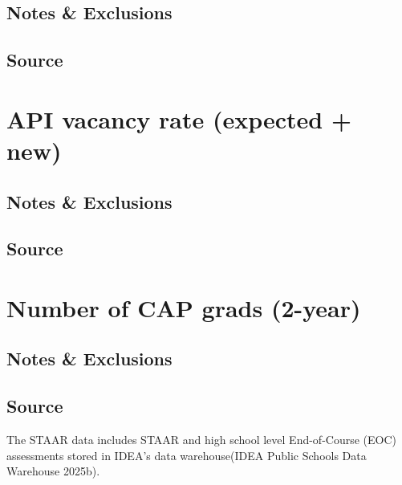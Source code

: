 \documentclass[
  letterpaper,
  DIV=11,
  numbers=noendperiod]{scrreprt}
\begin{document}
\subsection{Notes \& Exclusions}\label{notes-exclusions-3}

\subsection{Source}\label{source-6}

\section{API vacancy rate (expected + new)}\label{sec-05APIVacancy}

\subsection{Notes \& Exclusions}\label{notes-exclusions-4}

\subsection{Source}\label{source-7}

\section{Number of CAP grads (2-year)}\label{sec-05CAPGrads}

\subsection{Notes \& Exclusions}\label{notes-exclusions-5}

\subsection{Source}\label{source-8}

The STAAR data includes STAAR and high school level End-of-Course (EOC)
assessments stored in IDEA's data warehouse(IDEA Public Schools Data
Warehouse 2025b).
\end{document}
